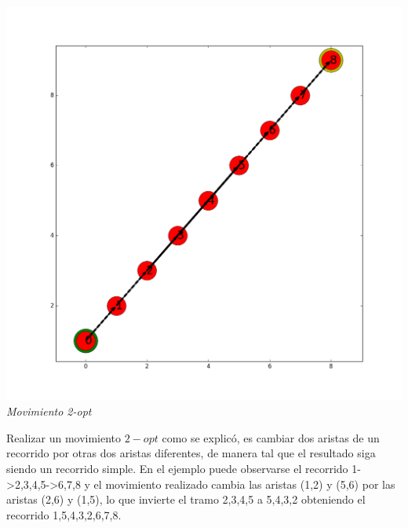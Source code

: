 \vspace*{0.3cm} \vspace*{0.3cm}
  \begin{center}
 \includegraphics[scale=0.3]{./EJ3/ejemplo2opt.png}\\
 {            \textit{Movimiento 2-opt}}
  \end{center}
  \vspace*{0.3cm}

Realizar un movimiento $2-opt$ como se explicó, es cambiar dos aristas de un recorrido por otras dos aristas diferentes, de manera tal que el resultado siga siendo un recorrido simple.
En el ejemplo puede observarse el recorrido 1->2,3,4,5->6,7,8 y el movimiento realizado cambia las aristas (1,2) y (5,6) por las aristas (2,6) y (1,5), lo que invierte el tramo 2,3,4,5 a 5,4,3,2 obteniendo el recorrido 1,5,4,3,2,6,7,8.
  
